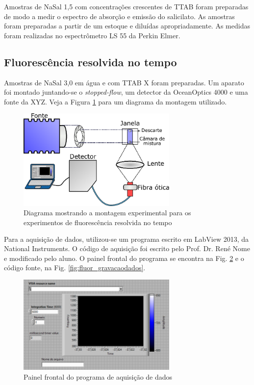 			Amostras de NaSal 1,5\mM{} com concentrações crescentes de TTAB foram preparadas de modo a medir o espectro de absorção e emissão do salicilato. As amostras foram preparadas a partir de um estoque e diluídas apropriadamente. As medidas foram realizadas no espectrômetro LS 55 da Perkin Elmer.
			
			\subsection{Fluorescência resolvida no tempo}
			\label{sec:experimental_fluor_resolvida}
			Amostras de NaSal 3,0\mM{} em água e com TTAB X\mM{} foram preparadas. Um aparato foi montado juntando-se o \emph{stopped-flow}, um detector da OceanOptics 4000 e uma fonte da XYZ. Veja a Figura \ref{fig:diagrama_stoppedflow_rene} para um diagrama da montagem utilizado.
			
			\begin{figure}[h]
				\centering
				\includegraphics[width=0.7\textwidth]{imagens/fluor/diagrama_stopped_flow_rene}
				\caption{Diagrama mostrando a montagem experimental para os experimentos de fluorescência resolvida no tempo}
				\label{fig:diagrama_stoppedflow_rene}
			\end{figure}
			
			Para a aquisição de dados, utilizou-se um programa escrito em LabView 2013, da National Instruments. O código de aquisição foi escrito pelo Prof. Dr. René Nome e modificado pelo aluno. O painel frontal do programa se encontra na Fig. \ref{fig:fluor_painelfrontal} e o código fonte, na Fig. \ref{fig:fluor_gravacaodados}.
			
			\begin{figure}[h]
				\centering
				\includegraphics[width=0.7\textwidth]{imagens/fluor/painel_frontal}
				\caption{Painel frontal do programa de aquisição de dados}
				\label{fig:fluor_painelfrontal}
			\end{figure}
			
